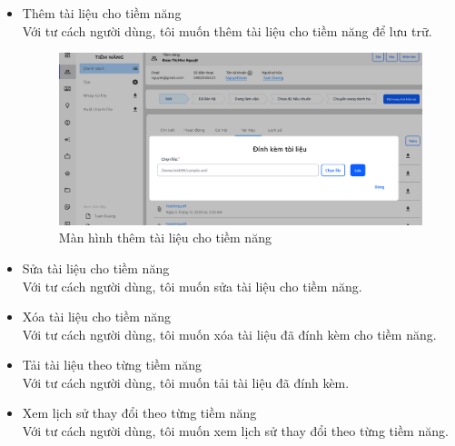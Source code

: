 \documentclass[12pt,a4paper]{article}
\begin{document}
\begin{enumerate}
\begin{itemize}
            \item  Thêm tài liệu cho tiềm năng \\
            Với tư cách người dùng, tôi muốn thêm tài liệu cho tiềm năng để lưu trữ.

            \begin{figure}[H]
                \centering \includegraphics[width=\textwidth]{Img/Nguyet/dinhkemtailieutn.png}
                \vspace{0.5cm}
                \caption{Màn hình thêm tài liệu cho tiềm năng}
                \label{dinhkemtailieu}
            \end{figure}


            \item Sửa tài liệu cho tiềm năng \\
            Với tư cách người dùng, tôi muốn sửa tài liệu cho tiềm năng.
            \item Xóa tài liệu cho tiềm năng \\
            Với tư cách người dùng, tôi muốn xóa tài liệu đã đính kèm cho tiềm năng.
            \item Tải tài liệu theo từng tiềm năng \\
            Với tư cách người dùng, tôi muốn tải tài liệu đã đính kèm.
            \item Xem lịch sử thay đổi theo từng tiềm năng \\
            Với tư cách người dùng, tôi muốn xem lịch sử thay đổi theo từng tiềm năng.


\end{itemize}
\end{enumerate}
\end{document}
